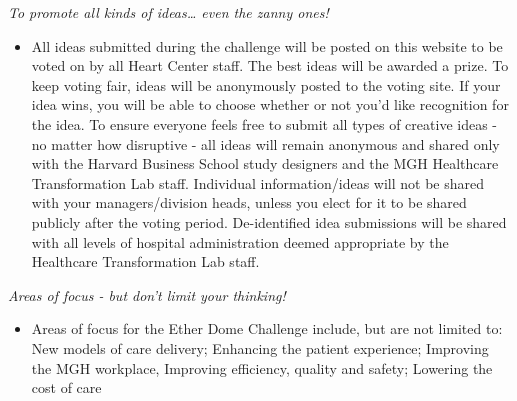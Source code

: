 \documentclass[12pt, titlepage]{article}
\providecommand{\tightlist}{%
  \setlength{\itemsep}{0pt}\setlength{\parskip}{0pt}}
\begin{document}
\emph{To promote all kinds of ideas\ldots{} even the zanny ones!}

\begin{itemize}
\tightlist
\item
  All ideas submitted during the challenge will be posted on this
  website to be voted on by all Heart Center staff. The best ideas will
  be awarded a prize. To keep voting fair, ideas will be anonymously
  posted to the voting site. If your idea wins, you will be able to
  choose whether or not you'd like recognition for the idea. To ensure
  everyone feels free to submit all types of creative ideas - no matter
  how disruptive - all ideas will remain anonymous and shared only with
  the Harvard Business School study designers and the MGH Healthcare
  Transformation Lab staff. Individual information/ideas will not be
  shared with your managers/division heads, unless you elect for it to
  be shared publicly after the voting period. De-identified idea
  submissions will be shared with all levels of hospital administration
  deemed appropriate by the Healthcare Transformation Lab staff.
\end{itemize}

\emph{Areas of focus - but don't limit your thinking!}

\begin{itemize}
\tightlist
\item
  Areas of focus for the Ether Dome Challenge include, but are not
  limited to: New models of care delivery; Enhancing the patient
  experience; Improving the MGH workplace, Improving efficiency, quality
  and safety; Lowering the cost of care
\end{itemize}


\end{document}
